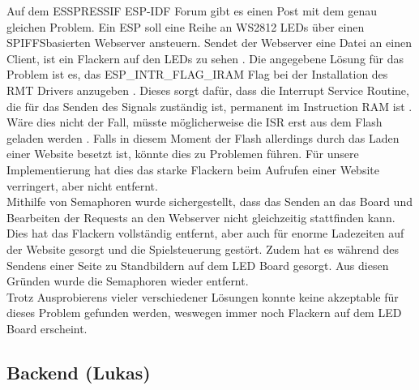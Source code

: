 \documentclass[12pt,a4paper]{article}
\begin{document}
Auf dem ESSPRESSIF ESP-IDF Forum gibt es einen Post mit dem genau gleichen Problem. Ein ESP soll eine Reihe an WS2812 LEDs über einen SPIFFSbasierten Webserver ansteuern. Sendet der Webserver eine Datei an einen Client, ist ein Flackern auf den LEDs zu sehen \cite{ESSPRESSIF:Forumspost}. Die angegebene Lösung für das Problem ist es, das \dq ESP\_INTR\_FLAG\_IRAM\dq{} Flag bei der Installation des RMT Drivers anzugeben \cite{ESSPRESSIF:Forumspost}. Dieses sorgt dafür, dass die Interrupt Service Routine, die für das Senden des Signals zuständig ist, permanent im Instruction RAM ist \cite{ESSPRESSIF:Reference}. Wäre dies nicht der Fall, müsste möglicherweise die ISR erst aus dem Flash geladen werden \cite{ESSPRESSIF:Reference}. Falls in diesem Moment der Flash allerdings durch das Laden einer Website besetzt ist, könnte dies zu Problemen führen. Für unsere Implementierung hat dies das starke Flackern beim Aufrufen einer Website verringert, aber nicht entfernt.\vspace{1ex}\\ 
Mithilfe von Semaphoren wurde sichergestellt, dass das Senden an das Board und Bearbeiten der Requests an den Webserver nicht gleichzeitig stattfinden kann. Dies hat das Flackern vollständig entfernt, aber auch für enorme Ladezeiten auf der Website gesorgt und die Spielsteuerung gestört. Zudem hat es während des Sendens einer Seite zu Standbildern auf dem LED Board gesorgt. Aus diesen Gründen wurde die Semaphoren wieder entfernt.
\vspace{1ex}\\ 
Trotz Ausprobierens vieler verschiedener Lösungen konnte keine akzeptable für dieses Problem gefunden werden, weswegen immer noch Flackern auf dem LED Board erscheint.
\subsection{Backend   (Lukas)} 
\end{document}

